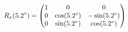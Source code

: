 \documentclass[preview]{standalone}
\begin{document}
\begin{align*}
\special{dvisvgm:raw <g id='unique000'>}R_x(5.2^\circ) = \begin{pmatrix} 1 & 0 & 0 \\ 0 & \cos(5.2^\circ) & -\sin(5.2^\circ) \\ 0 & \sin(5.2^\circ) & \cos(5.2^\circ) \end{pmatrix}\special{dvisvgm:raw </g>}
\end{align*}
\end{document}
